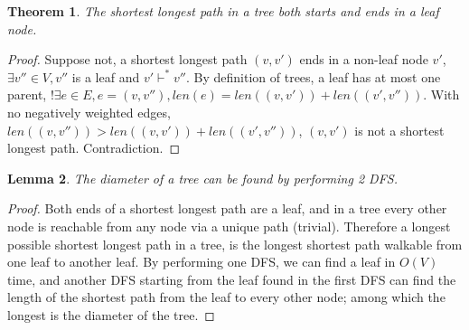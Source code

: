\documentclass{article}
\newtheorem{theorem}{Theorem}[section]
\newtheorem{lemma}[theorem]{Lemma}
\begin{document}
\begin{theorem}
    The shortest longest path in a tree both starts and ends in a leaf node.
\end{theorem}

\begin{proof}
    Suppose not, a shortest longest path $(v, v')$ ends in a non-leaf node $v'$, $\exists v''\in V, 
    v''$ is a leaf and $v' \vdash^* v''$. By definition of trees, a leaf has at most one parent, $!\exists e \in E, e = (v, v''), len(e) = len((v, v')) + len((v', v''))$. 
    With no negatively weighted edges, $len((v, v'')) > len((v, v')) + len((v', v''))$, $(v, v')$ is not a shortest longest path. Contradiction.
\end{proof}
\begin{lemma}
    The diameter of a tree can be found by performing 2 DFS.
\end{lemma}
\begin{proof}
    Both ends of a shortest longest path are a leaf, and in a tree every other node is reachable from any node via a unique path (trivial). 
    Therefore a longest possible shortest longest path in a tree, is the longest shortest path walkable from one leaf to another leaf.
    By performing one DFS, we can find a leaf in $O(V)$ time, and another DFS starting from the leaf found in the first DFS can find the length of the shortest path from the leaf
    to every other node; among which the longest is the diameter of the tree. 
\end{proof}
\end{document}
